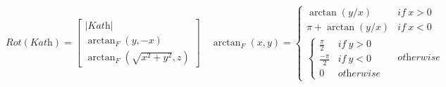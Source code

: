 \documentclass{article}
\newcommand{\vect}[1]{\left[\begin{array}{c}#1\end{array}\right]}
\begin{document}
    \begin{equation}
        \textit{Rot}(\textit{Kath}) = \vect{|\textit{Kath}| \\ \arctan_F(y, -x) \\ \arctan_F(\sqrt{x^2 + y^2}, z)} \quad
        \arctan_F(x, y) =\left\{
        \begin{array}{cc}
            \arctan(y / x) & \textit{if}\ x > 0 \ \\
            \pi + \arctan(y / x) & \textit{if} \ x < 0 \ \\
            
            \left\{\begin{array}{cc}
                \frac{\pi}{2} & \textit{if}\ y > 0 \ \\
                \frac{-\pi}{2} & \textit{if}\ y < 0 \ \\
                0 & \textit{otherwise}
            \end{array}\right. & \textit{otherwise} 
        \end{array}\right. 
    \end{equation}
\end{document}
